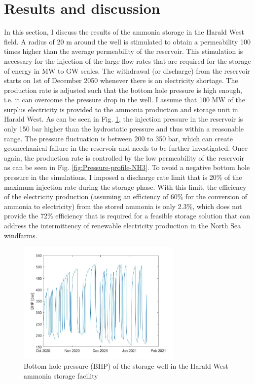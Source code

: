 \documentclass{ECOS_2021}
\begin{document}
\sffamily \section{Results and discussion}
\normalsize
In this section, I discuss the results of the ammonia storage in the Harald West field. A radius of 20
m around the well is stimulated to obtain a permeability 100 times
higher than the average permeability of the reservoir. This stimulation
is necessary for the injection of the large flow rates that are required
for the storage of energy in MW to GW scales. The withdrawal (or discharge) from
the reservoir starts on 1st of December 2050 whenever there is an
electricity shortage. The production rate is adjusted such that the
bottom hole pressure is high enough, i.e. it can overcome the pressure
drop in the well. I assume
that 100 MW of the surplus electricity is provided to the ammonia
production and storage unit in Harald West.
As can be seen in Fig. \ref{fig:Bottom-hole-pressure-NH3}, the injection
pressure in the reservoir is only 150 bar higher than the hydrostatic
pressure and thus within a reasonable range. The pressure fluctuation
is between 200 to 350 bar, which can create geomechanical failure
in the reservoir and needs to be further investigated. Once again,
the production rate is controlled by the low permeability of the reservoir
as can be seen in Fig. \ref{fig:Pressure-profile-NH3}. To avoid a
negative bottom hole pressure in the simulations, I imposed a discharge
rate limit that is 20\% of the maximum injection rate during the storage
phase. With this limit, the efficiency of the electricity production
(assuming an efficiency of 60\% for the conversion of ammonia to electricity)
from the stored ammonia is only 2.3\%, which does not provide the 72\% efficiency
that is required for a feasible storage solution that can address
the intermittency of renewable electricity production in the North
Sea windfarms.

\begin{figure}[H]
\centering
\includegraphics[width=8cm]{ammonia_p_hist}

\caption{\label{fig:Bottom-hole-pressure-NH3}Bottom hole pressure (BHP) of
the storage well in the Harald West ammonia storage facility}
\end{figure}
\end{document}
